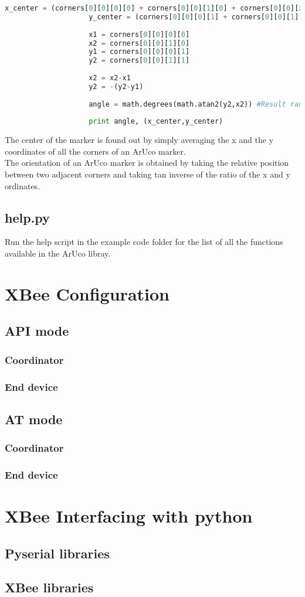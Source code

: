 				\pagebreak
				\begin{lstlisting}[language=Python, caption = Pose and Oriention Calculation]
					x_center = (corners[0][0][0][0] + corners[0][0][1][0] + corners[0][0][2][0] + corners[0][0][3][0])/4
					y_center = (corners[0][0][0][1] + corners[0][0][1][1] + corners[0][0][2][1] + corners[0][0][3][1])/4
					
					x1 = corners[0][0][0][0]
					x2 = corners[0][0][1][0]
					y1 = corners[0][0][0][1]
					y2 = corners[0][0][1][1]
					
					x2 = x2-x1
					y2 = -(y2-y1)
					
					angle = math.degrees(math.atan2(y2,x2)) #Result ranges from -180 to 180
					
					print angle, (x_center,y_center)		
				\end{lstlisting}
				
				The center of the marker is found out by simply averaging the x and the y coordinates of all the corners of an ArUco marker.\\
				The orientation of an ArUco marker is obtained by taking the relative position between two adjacent corners and taking tan inverse of the ratio of the x and y ordinates.
				
			\subsection{help.py}
				Run the help script in the example code folder for the list of all the functions available in the ArUco libray.\\
					
	\section{XBee Configuration}
		\subsection{API mode}
			\subsubsection{Coordinator}
			\subsubsection{End device}
		\subsection{AT mode}
			\subsubsection{Coordinator}
			\subsubsection{End device}
	\section{XBee Interfacing  with python}
			\subsection{Pyserial libraries}
			\subsection{XBee libraries}